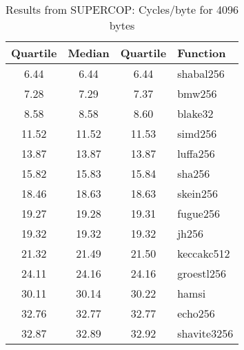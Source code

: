 \begin{table}
  \centering
  \caption{Results from SUPERCOP: Cycles/byte for 4096 bytes}
  \begin{tabular}{ | c | c | c | l | }
    \hline
    \textbf{Quartile} & \textbf{Median} & \textbf{Quartile} & \textbf{Function} \\ \hline
    6.44 & 6.44 & 6.44 & shabal256 \\ \hline
    7.28 & 7.29 & 7.37 & bmw256 \\ \hline
    8.58 & 8.58 & 8.60 & blake32 \\ \hline
    11.52 & 11.52 & 11.53 & simd256 \\ \hline
    13.87 & 13.87 & 13.87 & luffa256 \\ \hline
    15.82 & 15.83 & 15.84 & sha256 \\ \hline
    18.46 & 18.63 & 18.63 & skein256 \\ \hline
    19.27 & 19.28 & 19.31 & fugue256 \\ \hline
    19.32 & 19.32 & 19.32 & jh256 \\ \hline
    21.32 & 21.49 & 21.50 & keccakc512 \\ \hline
    24.11 & 24.16 & 24.16 & groestl256 \\ \hline
    30.11 & 30.14 & 30.22 & hamsi \\ \hline
    32.76 & 32.77 & 32.77 & echo256 \\ \hline
    32.87 & 32.89 & 32.92 & shavite3256 \\ \hline
  \end{tabular}
  \label{tbl:supercop:4096}
\end{table}
